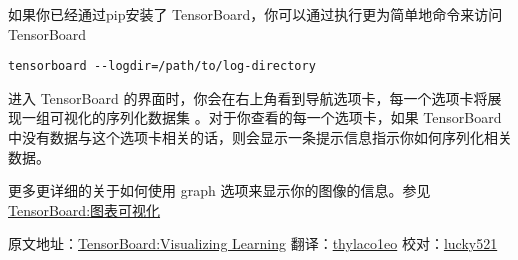 如果你已经通过pip安装了 TensorBoard，你可以通过执行更为简单地命令来访问
TensorBoard

\begin{verbatim}
tensorboard --logdir=/path/to/log-directory
\end{verbatim}

进入 TensorBoard
的界面时，你会在右上角看到导航选项卡，每一个选项卡将展现一组可视化的序列化数据集
。对于你查看的每一个选项卡，如果 TensorBoard
中没有数据与这个选项卡相关的话，则会显示一条提示信息指示你如何序列化相关数据。

更多更详细的关于如何使用 graph 选项来显示你的图像的信息。参见
\href{./graph_viz.md}{TensorBoard:图表可视化}

原文地址：\href{http://tensorflow.org/how_tos/summaries_and_tensorboard/index.html\#tensorboard-visualizing-learning}{TensorBoard:Visualizing
Learning} 翻译：\href{https://github.com/thylaco1eo}{thylaco1eo}
校对：\href{https://github.com/lucky521}{lucky521}

